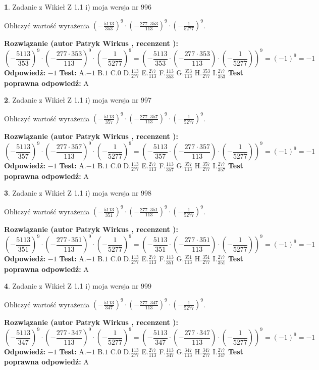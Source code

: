 \documentclass[12pt, a4paper]{article}
\theoremstyle{definition} %
\newtheorem{zad}{}
\newcommand{\zadStart}[1]{\begin{zad}#1\newline}
\newcommand{\zadStop}{\end{zad}}
\newcommand{\rozwStart}[2]{\noindent \textbf{Rozwiązanie (autor #1 , recenzent #2): }\newline}
\newcommand{\rozwStop}{\newline}
\newcommand{\odpStart}{\noindent \textbf{Odpowiedź:}\newline}
\newcommand{\odpStop}{\newline}
\newcommand{\testStart}{\noindent \textbf{Test:}\newline}
\newcommand{\testStop}{\newline}
\newcommand{\kluczStart}{\noindent \textbf{Test poprawna odpowiedź:}\newline}
\newcommand{\kluczStop}{\newline}
\begin{document}
\zadStart{Zadanie z Wikieł Z 1.1 i) moja wersja nr 996}

Obliczyć wartość wyrażenia $(-\frac{5113}{353})^{9} \cdot (-\frac{277 \cdot 353}{113})^{9} \cdot (-\frac{1}{5277})^{9}$.
\zadStop
\rozwStart{Patryk Wirkus}{}
$$(-\frac{5113}{353})^{9} \cdot (-\frac{277 \cdot 353}{113})^{9} \cdot (-\frac{1}{5277})^{9} = (-\frac{5113}{353} \cdot (-\frac{277 \cdot 353}{113}) \cdot (-\frac{1}{5277}))^{9} = (-1)^{9} = -1$$
\rozwStop
\odpStart
$-1$
\odpStop
\testStart
A.$-1$ B.$1$ C.$0$ D.$\frac{113}{277}$ E.$\frac{277}{113}$
F.$\frac{113}{353}$ G.$\frac{353}{113}$
H.$\frac{353}{277}$
I.$\frac{277}{353}$
\testStop
\kluczStart
A
\kluczStop



\zadStart{Zadanie z Wikieł Z 1.1 i) moja wersja nr 997}

Obliczyć wartość wyrażenia $(-\frac{5113}{357})^{9} \cdot (-\frac{277 \cdot 357}{113})^{9} \cdot (-\frac{1}{5277})^{9}$.
\zadStop
\rozwStart{Patryk Wirkus}{}
$$(-\frac{5113}{357})^{9} \cdot (-\frac{277 \cdot 357}{113})^{9} \cdot (-\frac{1}{5277})^{9} = (-\frac{5113}{357} \cdot (-\frac{277 \cdot 357}{113}) \cdot (-\frac{1}{5277}))^{9} = (-1)^{9} = -1$$
\rozwStop
\odpStart
$-1$
\odpStop
\testStart
A.$-1$ B.$1$ C.$0$ D.$\frac{113}{277}$ E.$\frac{277}{113}$
F.$\frac{113}{357}$ G.$\frac{357}{113}$
H.$\frac{357}{277}$
I.$\frac{277}{357}$
\testStop
\kluczStart
A
\kluczStop



\zadStart{Zadanie z Wikieł Z 1.1 i) moja wersja nr 998}

Obliczyć wartość wyrażenia $(-\frac{5113}{351})^{9} \cdot (-\frac{277 \cdot 351}{113})^{9} \cdot (-\frac{1}{5277})^{9}$.
\zadStop
\rozwStart{Patryk Wirkus}{}
$$(-\frac{5113}{351})^{9} \cdot (-\frac{277 \cdot 351}{113})^{9} \cdot (-\frac{1}{5277})^{9} = (-\frac{5113}{351} \cdot (-\frac{277 \cdot 351}{113}) \cdot (-\frac{1}{5277}))^{9} = (-1)^{9} = -1$$
\rozwStop
\odpStart
$-1$
\odpStop
\testStart
A.$-1$ B.$1$ C.$0$ D.$\frac{113}{277}$ E.$\frac{277}{113}$
F.$\frac{113}{351}$ G.$\frac{351}{113}$
H.$\frac{351}{277}$
I.$\frac{277}{351}$
\testStop
\kluczStart
A
\kluczStop



\zadStart{Zadanie z Wikieł Z 1.1 i) moja wersja nr 999}

Obliczyć wartość wyrażenia $(-\frac{5113}{347})^{9} \cdot (-\frac{277 \cdot 347}{113})^{9} \cdot (-\frac{1}{5277})^{9}$.
\zadStop
\rozwStart{Patryk Wirkus}{}
$$(-\frac{5113}{347})^{9} \cdot (-\frac{277 \cdot 347}{113})^{9} \cdot (-\frac{1}{5277})^{9} = (-\frac{5113}{347} \cdot (-\frac{277 \cdot 347}{113}) \cdot (-\frac{1}{5277}))^{9} = (-1)^{9} = -1$$
\rozwStop
\odpStart
$-1$
\odpStop
\testStart
A.$-1$ B.$1$ C.$0$ D.$\frac{113}{277}$ E.$\frac{277}{113}$
F.$\frac{113}{347}$ G.$\frac{347}{113}$
H.$\frac{347}{277}$
I.$\frac{277}{347}$
\testStop
\kluczStart
A
\kluczStop
\end{document}
